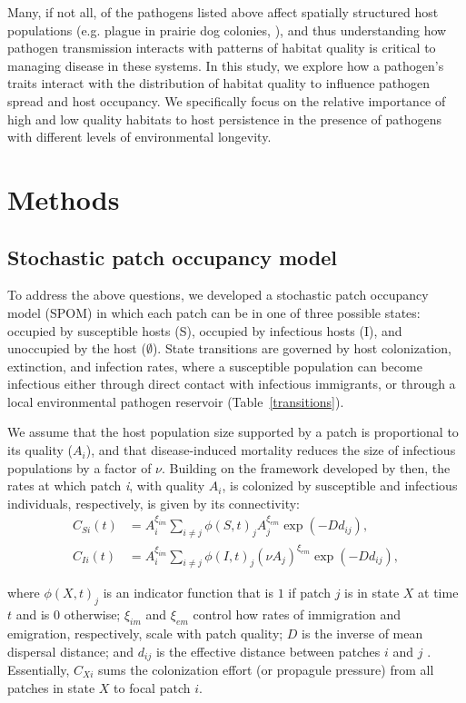 \documentclass{article}
\begin{document}
Many, if not all, of the pathogens listed above affect spatially structured host populations (e.g. plague in prairie dog colonies, \cite{George2013}), and thus understanding how pathogen transmission interacts with patterns of habitat quality is critical to managing disease in these systems.  In this study, we explore how a pathogen's traits interact with the distribution of habitat quality to influence pathogen spread and host occupancy.  We specifically focus on the relative importance of high and low quality habitats to host persistence in the presence of pathogens with different levels of environmental longevity. 

\section{Methods}
\label{methods}

\subsection{Stochastic patch occupancy model}


To address the above questions, we developed a stochastic patch occupancy model (SPOM) in which each patch can be in one of three possible states: occupied by susceptible hosts (S), occupied by infectious hosts (I), and unoccupied by the host ($\emptyset$).  State transitions are governed by host colonization, extinction, and infection rates, where a susceptible population can become infectious either through direct contact with infectious immigrants, or through a local environmental pathogen reservoir (Table~\ref{transitions}).

We assume that the host population size supported by a patch is proportional to its quality ($A_i$), and that disease-induced mortality reduces the size of infectious populations by a factor of $\nu$.  Building on the framework developed by \cite{Hanski2003} then, the rates at which patch \emph{i}, with quality $A_i$, is colonized by susceptible and infectious individuals, respectively, is given by its connectivity:
\begin{align}
C_{Si}(t) &= A_i^{\xi_{im}} \sum_{i\neq j }\phi(S, t)_jA_j^{\xi_{em}}\exp(-D d_{ij}),\\
C_{Ii}(t) &= A_i^{\xi_{im}} \sum_{i\neq j }\phi(I, t)_j(\nu A_j) ^{\xi_{em}}\exp(-D d_{ij}),
\label{connectivity}
\end{align}

where $\phi(X, t)_j$ is an indicator function that is $1$ if patch $j$ is in state $X$ at time $t$ and is $0$ otherwise; $\xi_{im}$ and $\xi_{em}$ control how rates of immigration and emigration, respectively, scale with patch quality; $D$ is the inverse of mean dispersal distance; and $d_{ij}$ is the effective distance between patches $i$ and $j$ .  Essentially, $C_{Xi}$ sums the colonization effort (or propagule pressure) from all patches in state $X$ to focal patch $i$.  
\end{document}
